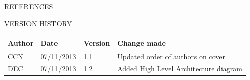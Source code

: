 \documentclass{article}
\begin{document}
	\nocite{LaTeXTemplate}

	\newpage
	\begin{section}{REFERENCES}
		
		
	\end{section}
	
	\vspace{1cm}
	\begin{section}{VERSION HISTORY}
		\begin{tabularx}{\linewidth}{| p{2cm} | p{2cm} | p{2cm} | X | }
			\hline
			\bf{Author} & \bf{Date} & \bf{Version} & \bf{Change made} \\
			\hline
			CCN & 07/11/2013 & 1.1 & Updated order of authors on cover \\
			\hline
			DEC & 07/11/2013 & 1.2 & Added High Level Architecture diagram \\
			\hline
		\end{tabularx}
	\end{section}
\end{document}
